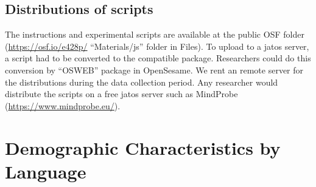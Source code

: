\documentclass[
  man,mask,floatsintext]{apa7}
\begin{document}
\hypertarget{distributions-of-scripts}{%
\subsection{Distributions of scripts}\label{distributions-of-scripts}}

The instructions and experimental scripts are available at the public OSF folder (\url{https://osf.io/e428p/} ``Materials/js'' folder in Files). To upload to a jatos server, a script had to be converted to the compatible package. Researchers could do this conversion by ``OSWEB'' package in OpenSesame. We rent an remote server for the distributions during the data collection period. Any researcher would distribute the scripts on a free jatos server such as MindProbe (\url{https://www.mindprobe.eu/}).

\hypertarget{demographic-characteristics-by-language}{%
\section{Demographic Characteristics by Language}\label{demographic-characteristics-by-language}}
\end{document}
